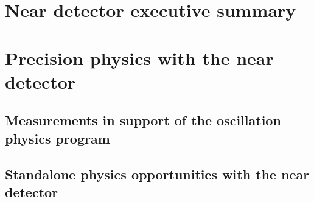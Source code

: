 \chapter{Near detector executive summary}
\label{ch:nd-execsum}



\chapter{Precision physics with the near detector}
\label{ch:prec-nd}


\section{Measurements in support of the oscillation physics program}
\label{sec:prec-nd-support}


\section{Standalone physics opportunities with the near detector}
\label{sec:prec-nd-standalone}
